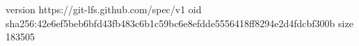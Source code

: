 version https://git-lfs.github.com/spec/v1
oid sha256:42e6ef5beb6bfd43fb483c6b1c59bc6e8efdde5556418ff8294e2d4fdcbf300b
size 183505

